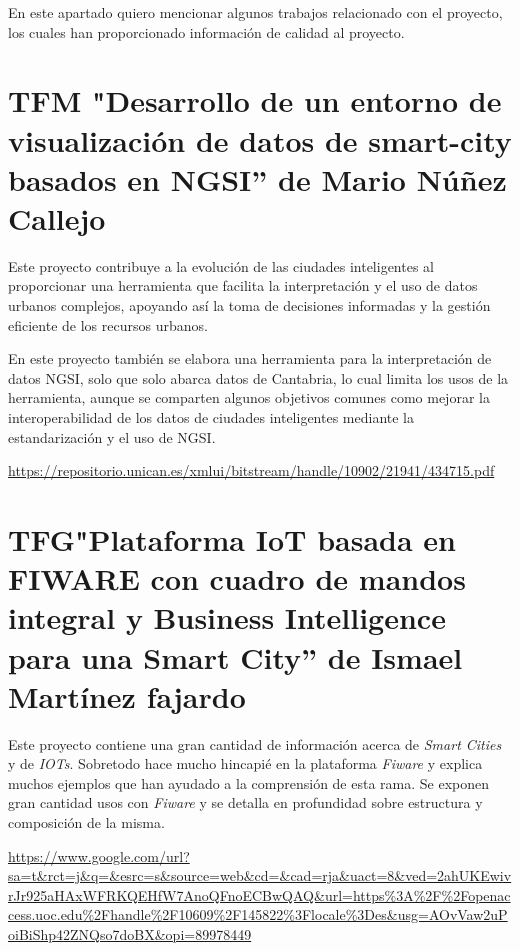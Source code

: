 
\begin{comment}
Este apartado sería parecido a un estado del arte de una tesis o tesina. En un trabajo final grado no parece obligada su presencia, aunque se puede dejar a juicio del tutor el incluir un pequeño resumen comentado de los trabajos y proyectos ya realizados en el campo del proyecto en curso. 
\end{comment}

En este apartado quiero mencionar algunos trabajos relacionado con el proyecto, los cuales han proporcionado información de calidad al proyecto.

 \section{TFM "Desarrollo de un entorno de visualización de datos de smart-city basados en NGSI” de Mario Núñez Callejo}
 
 Este proyecto contribuye a la evolución de las ciudades inteligentes al proporcionar una herramienta que facilita la interpretación y el uso de datos urbanos complejos, apoyando así la toma de decisiones informadas y la gestión eficiente de los recursos urbanos.

En este proyecto también se elabora una herramienta para la interpretación de datos NGSI, solo que solo abarca datos de Cantabria, lo cual limita los usos de la herramienta, aunque se comparten algunos objetivos comunes como mejorar la interoperabilidad de los datos de ciudades inteligentes mediante la estandarización y el uso de NGSI.

\url{https://repositorio.unican.es/xmlui/bitstream/handle/10902/21941/434715.pdf}

\section{TFG"Plataforma IoT basada en FIWARE con cuadro de mandos integral y Business Intelligence para una Smart City” de Ismael Martínez fajardo}

Este proyecto contiene una gran cantidad de información acerca de \textit{Smart Cities} y de \textit{IOTs}. Sobretodo hace mucho hincapié en la plataforma \textit{Fiware} y explica muchos ejemplos que han ayudado a la comprensión de esta rama. 
Se exponen gran cantidad usos con \textit{Fiware} y se detalla en profundidad sobre estructura y composición
de la misma.

\url{https://www.google.com/url?sa=t&rct=j&q=&esrc=s&source=web&cd=&cad=rja&uact=8&ved=2ahUKEwivrJr925aHAxWFRKQEHfW7AnoQFnoECBwQAQ&url=https%3A%2F%2Fopenaccess.uoc.edu%2Fhandle%2F10609%2F145822%3Flocale%3Des&usg=AOvVaw2uPoiBiShp42ZNQso7doBX&opi=89978449}